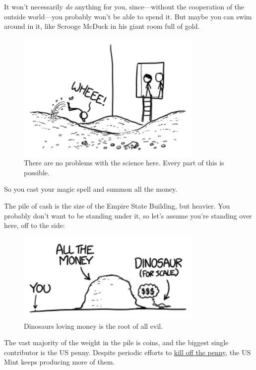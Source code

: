 {{It won't necessarily \emph{do} anything for you, since—without the cooperation of the outside world—you probably won't be able to spend it. But maybe you can swim around in it, like Scrooge McDuck in his giant room full of gold.}

\begin{figure}[!htbp]
\centering
\includegraphics[scale=0.5, max width=0.8\textwidth]{imgs/a/111/scrooge.png}
\caption{There are no problems with the science here. Every part of this is possible.}
\end{figure}

{So you cast your magic spell and summon all the money.}

{The pile of cash is the size of the Empire State Building, but heavier. You probably don't want to be standing under it, so let's assume you're standing over here, off to the side:}

\begin{figure}[!htbp]
\centering
\includegraphics[scale=0.5, max width=0.8\textwidth]{imgs/a/111/distance.png}
\caption{Dinosaurs loving money is the root of all evil.}
\end{figure}

{The vast majority of the weight in the pile is coins, and the biggest single contributor is the US penny. Despite periodic efforts to \href{http://www.retirethepenny.org/}{kill off the penny}, the US Mint keeps producing more of them.}

}
